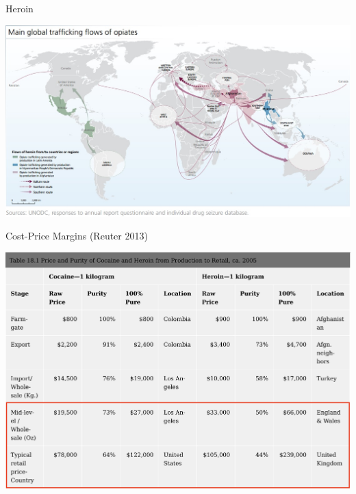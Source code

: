 \documentclass[10pt,ignorenonframetext,]{beamer}
\begin{document}
\begin{frame}{Heroin}
\protect\hypertarget{heroin}{}

\includegraphics{../chicago/figs/opium_supply_map.jpg}

\end{frame}

\begin{frame}{Cost-Price Margins (Reuter 2013)}
\protect\hypertarget{cost-price-margins-reuter2010}{}

\includegraphics{../chicago/figs/Reuter_costprice.png}

\end{frame}
\end{document}
